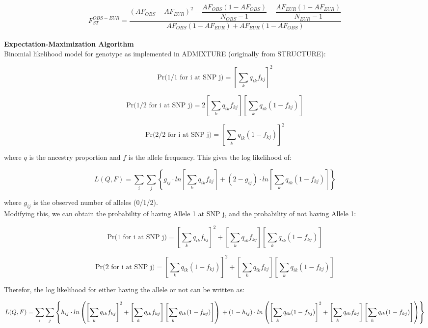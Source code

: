 \documentclass[11pt,a4paper]{article}
\begin{document}
$$F_{ST}^{OBS-EUR} =  \dfrac{ \left( AF_{OBS} - AF_{EUR} \right)^2 - \dfrac{AF_{OBS} \left( 1 - AF_{OBS} \right)}{N_{OBS} - 1} - \dfrac{AF_{EUR} \left( 1 - AF_{EUR} \right)}{N_{EUR} - 1} }{AF_{OBS} \left( 1 - AF_{EUR} \right) + AF_{EUR} \left( 1 - AF_{OBS} \right)}$$\\

\textbf{Expectation-Maximization Algorithm}\\

Binomial likelihood model for genotype as implemented in ADMIXTURE (originally from STRUCTURE):

$$ \mbox{Pr(1/1 for i at SNP j)} = \left[ \sum_k q_{ik} f_{kj} \right]^2$$

$$ \mbox{Pr(1/2 for i at SNP j)} = 2 \left[ \sum_k q_{ik} f_{kj} \right] \left[ \sum_k q_{ik} (1 - f_{kj}) \right]$$

$$ \mbox{Pr(2/2 for i at SNP j)} = \left[ \sum_k q_{ik} (1 - f_{kj}) \right]^2$$

where $q$ is the ancestry proportion and $f$ is the allele frequency. This gives the log likelihood of:

$$ L(Q,F) = \sum_i \sum_j \left\lbrace g_{ij} \cdot ln \left[ \sum_k q_{ik} f_{kj} \right] + (2 - g_{ij}) \cdot ln \left[ \sum_k q_{ik} (1 - f_{kj}) \right] \right\rbrace $$

where $g_{ij}$ is the observed number of alleles (0/1/2).\\

Modifying this, we can obtain the probability of having Allele 1 at SNP j, and the probability of not having Allele 1:

$$ \mbox{Pr(1 for i at SNP j)} = \left[ \sum_k q_{ik} f_{kj} \right]^2 + \left[ \sum_k q_{ik} f_{kj} \right] \left[ \sum_k q_{ik} (1 - f_{kj}) \right]$$

$$ \mbox{Pr(2 for i at SNP j)} = \left[ \sum_k q_{ik} (1 - f_{kj}) \right]^2 + \left[ \sum_k q_{ik} f_{kj} \right] \left[ \sum_k q_{ik} (1 - f_{kj}) \right]$$

Therefor, the log likelihood for either having the allele or not can be written as:

$$ L(Q,F) = \sum_i \sum_j \left\lbrace h_{ij} \cdot ln \left( \left[ \sum_k q_{ik} f_{kj} \right]^2 + \left[ \sum_k q_{ik} f_{kj} \right] \left[ \sum_k q_{ik} (1 - f_{kj}) \right] \right) \\
 + (1 - h_{ij}) \cdot ln \left( \left[ \sum_k q_{ik} (1 - f_{kj}) \right]^2 + \left[ \sum_k q_{ik} f_{kj} \right] \left[ \sum_k q_{ik} (1 - f_{kj}) \right] \right) \right\rbrace $$
\end{document}
